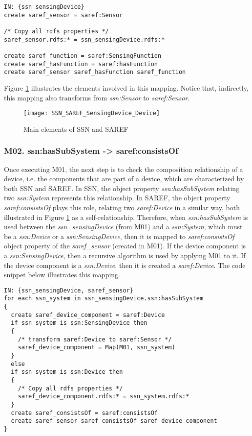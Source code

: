\documentclass{sig-alternate-05-2015}
\begin{document}
\begin{lstlisting}[caption={Pseudocode snippet for M01},label={code:sample}]
IN: {ssn_sensingDevice}  
create saref_sensor = saref:Sensor  

/* Copy all rdfs properties */ 
saref_sensor.rdfs:* = ssn_sensingDevice.rdfs:*
    
create saref_function = saref:SensingFunction  
create saref_hasFunction = saref:hasFunction  
create saref_sensor saref_hasFunction saref_function  

\end{lstlisting}

Figure \ref{fig:SSN_SAREF_SensingDevice_Device} illustrates the elements involved in this mapping. Notice that, indirectly, this mapping also transforms from \textit{ssn:Sensor} to \textit{saref:Sensor}.

\begin{figure}[h!]
\centering
\texttt{[image: SSN\_SAREF\_SensingDevice\_Device]}
\caption{Main elements of SSN and SAREF}
\label{fig:SSN_SAREF_SensingDevice_Device}
\end{figure}

\subsubsection{M02. ssn:hasSubSystem -> saref:consistsOf}
Once executing M01, the next step is to check the composition relationship of a device, i.e. the components that are part of a device, which are characterized by both SSN and SAREF. In SSN, the object property \textit{ssn:hasSubSystem} relating two \textit{ssn:System} represents this relationship. In SAREF, the object property \textit{saref:consistsOf} plays this role, relating two \textit{saref:Device} in a similar way, both illustrated in Figure \ref{fig:SSN_SAREF_SensingDevice_Device} as a self-relationship. Therefore, when \textit{ssn:hasSubSystem} is used between the \textit{ssn\_sensingDevice} (from M01) and a \textit{ssn:System}, which must be a \textit{ssn:Device} or a \textit{ssn:SensingDevice}, then it is mapped to \textit{saref:consistsOf} object property of the \textit{saref\_sensor} (created in M01). If the device component is a \textit{ssn:SensingDevice}, then a recursive algorithm is used by applying M01 to it. If the device component is a \textit{ssn:Device}, then it is created a \textit{saref:Device}. The code snippet below illustrates this mapping.

\begin{lstlisting}[caption={Pseudocode snippet for M02},label={code:sample}]
IN: {ssn_sensingDevice, saref_sensor}
for each ssn_system in ssn_sensingDevice.ssn:hasSubSystem 
{ 
  create saref_device_component = saref:Device 
  if ssn_system is ssn:SensingDevice then 
  { 
    /* transform saref:Device to saref:Sensor */
    saref_device_component = Map(M01, ssn_system) 
  } 
  else 
  if ssn_system is ssn:Device then 
  { 
    /* Copy all rdfs properties */ 
    saref_device_component.rdfs:* = ssn_system.rdfs:* 
  } 
  create saref_consistsOf = saref:consistsOf 
  create saref_sensor saref_consistsOf saref_device_component 
}
\end{lstlisting}
\end{document}
